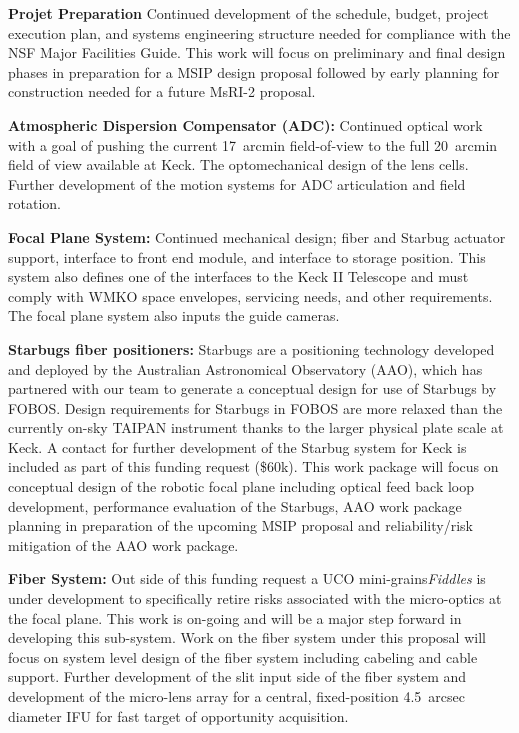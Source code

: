 \noindent \textbf{Projet Preparation} Continued development of the
schedule, budget, project execution plan, and systems engineering
structure needed for compliance with the NSF Major Facilities Guide.
This work will focus on preliminary and final design phases in
preparation for a MSIP design proposal followed by early planning for
construction needed for a future MsRI-2 proposal. 

\noindent \textbf{Atmospheric Dispersion Compensator (ADC):} Continued
optical work with a goal of pushing the current 17~arcmin field-of-view
to the full 20~arcmin field of view available at Keck.  The
optomechanical design of the lens cells.  Further development of the
motion systems for ADC articulation and field rotation.

\noindent \textbf{Focal Plane System:} Continued mechanical design;
fiber and Starbug actuator support, interface to front end module, and
interface to storage position. This system also defines one of the
interfaces to the Keck II Telescope and must comply with WMKO space
envelopes, servicing needs, and other requirements. The focal plane
system also inputs the guide cameras. 

\noindent \textbf{Starbugs fiber positioners:} Starbugs are a
positioning technology developed and deployed by the Australian
Astronomical Observatory (AAO), which has partnered with our team to
generate a conceptual design for use of Starbugs by FOBOS.  Design
requirements for Starbugs in FOBOS are more relaxed than the currently
on-sky TAIPAN instrument thanks to the larger physical plate scale at
Keck. A contact for further development of the Starbug system for Keck
is included as part of this funding request (\$60k).  This work package
will focus on conceptual design of the robotic focal plane including
optical feed back loop development, performance evaluation of the
Starbugs, AAO work package planning in preparation of the upcoming MSIP
proposal and reliability/risk mitigation of the AAO work package.

\noindent \textbf{Fiber System:} Out side of this funding request a UCO
mini-grains{\it Fiddles} is under development to specifically retire
risks associated with the micro-optics at the focal plane.  This work is
on-going and will be a major step forward in developing this sub-system.
Work on the fiber system under this proposal will focus on system level
design of the fiber system including cabeling and cable support. Further
development of the slit input side of the fiber system and development
of the micro-lens array for a central, fixed-position 4.5~arcsec
diameter IFU for fast target of opportunity acquisition.

